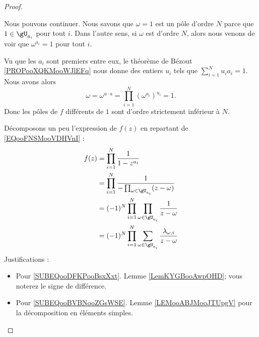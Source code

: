 \begin{proof}
\begin{subproof}
		Nous pouvons continuer.
		\spitem[\( m_{\omega}=N\) si et seulement si \( \omega=1\)]
		Nous savons que \( \omega=1\) est un pôle d'ordre \( N\) parce que \( 1\in \gU_{a_i}\) pour tout \( i\). Dans l'autre sens, si \( \omega\) est d'ordre \( N\), alors nous venons de voir que \( \omega^{a_i}=1\) pour tout \( i\).

		Vu que les \( a_i\) sont premiers entre eux, le théorème de Bézout \ref{PROPooXQKMooWJlEFq} nous donne des entiers \( u_i\) tels que \( \sum_{i=1}^Nu_ia_i=1\). Nous avons alors
		\begin{equation}
			\omega=\omega^{u\cdot a}=\prod_{i=1}^N(\omega^{a_i})^{u_i}=1.
		\end{equation}
		Donc les pôles de \( f\) différents de \( 1\) sont d'ordre strictement inférieur à \( N\).

		Décomposons un peu l'expression de \( f(z)\) en repartant de \eqref{EQooFNSMooVDHVnI} :
		\begin{subequations}
			\begin{align}
				f(z) & =\prod_{i=1}^N\frac{1}{ 1-z^{a_i} }                                                                                 \\
				     & =\prod_{i=1}^N\frac{1}{ -\prod_{\omega\in \gU_{a_i}}(z-\omega) }     \label{SUBEQooDFKPooBsxXxt}                    \\
				     & =(-1)^N\prod_{i=1}^{N}\prod_{\omega\in \gU_{a_i}}\frac{1}{ z-\omega }                                               \\
				     & =(-1)^N\prod_{i=1}^N\sum_{\omega\in \gU_{a_i}}\frac{ \lambda_{\omega,i} }{ z-\omega }   \label{SUBEQooBVBNooZGsWSE}
			\end{align}
		\end{subequations}
		Justifications :
		\begin{itemize}
			\item Pour \eqref{SUBEQooDFKPooBsxXxt}. Lemme \ref{LemKYGBooAwpOHD}; vous noterez le signe de différence.
			\item Pour \eqref{SUBEQooBVBNooZGsWSE}. Lemme \ref{LEMooABJMooJTUpgV} pour la décomposition en éléments simples.
		\end{itemize}


\end{subproof}
\end{proof}
